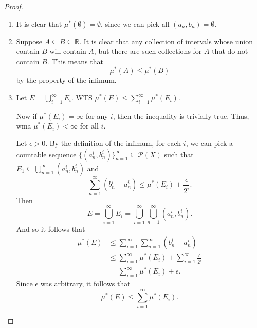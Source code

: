 \documentclass[notoc,notitlepage]{tufte-book}
\begin{document}
\begin{proof}
  \begin{enumerate}
    \item It is clear that $\mu^*(\emptyset) = \emptyset$,
      since we can pick all $(a_n, b_n) = \emptyset$.
    \item Suppose $A \subseteq B \subseteq \mathbb{R}$.
      It is clear that any collection of intervals whose union contain $B$
      will contain $A$, but there are such collections for $A$ that do not
      contain $B$.
      This means that
      \begin{equation*}
        \mu^*(A) \leq \mu^*(B)
      \end{equation*}
      by the property of the infimum.
    \item Let $E = \bigcup_{i=1}^{\infty} E_i$.
      WTS $\mu^*(E) \leq \sum_{i=1}^{\infty} \mu^*(E_i)$.

      Now if $\mu^*(E_i) = \infty$ for any $i$,
      then the inequality is trivially true.
      Thus, wma $\mu^*(E_i) < \infty$ for all $i$.

      Let $\epsilon > 0$.
      By the definition of the infimum, for each $i$,
      we can pick a countable sequence
      $\{ (a_n^i, b_n^i) \}_{n=1}^{\infty} \subseteq \mathcal{P}(X)$
      such that $E_1 \subseteq \bigcup_{n=1}^{\infty} (a_n^i, b_n^i)$ and
      \begin{equation*}
        \sum_{n=1}^{\infty} (b_n^i - a_n^i)
        \leq \mu^*(E_i) + \frac{\epsilon}{2^i}.
      \end{equation*}
      Then
      \begin{equation*}
        E = \bigcup_{i=1}^{\infty} E_i
        = \bigcup_{i=1}^{\infty} \bigcup_{n=1}^{\infty} (a_n^i, b_n^i).
      \end{equation*}
      And so it follows that
      \begin{align*}
        \mu^*(E)
        &\leq \sum_{i=1}^{\infty} \sum_{n=1}^{\infty} (b_n^i - a_n^i) \\
        &\leq \sum_{i=1}^{\infty} \mu^*(E_i)
          + \sum_{i=1}^{\infty} \frac{\epsilon}{2^i} \\
        &= \sum_{i=1}^{\infty} \mu^*(E_i) + \epsilon.
      \end{align*}
      Since $\epsilon$ was arbitrary, it follows that
      \begin{equation*}
        \mu^*(E) \leq \sum_{i=1}^{\infty} \mu^*(E_i).
      \end{equation*}
  \end{enumerate}
\end{proof}
\end{document}
